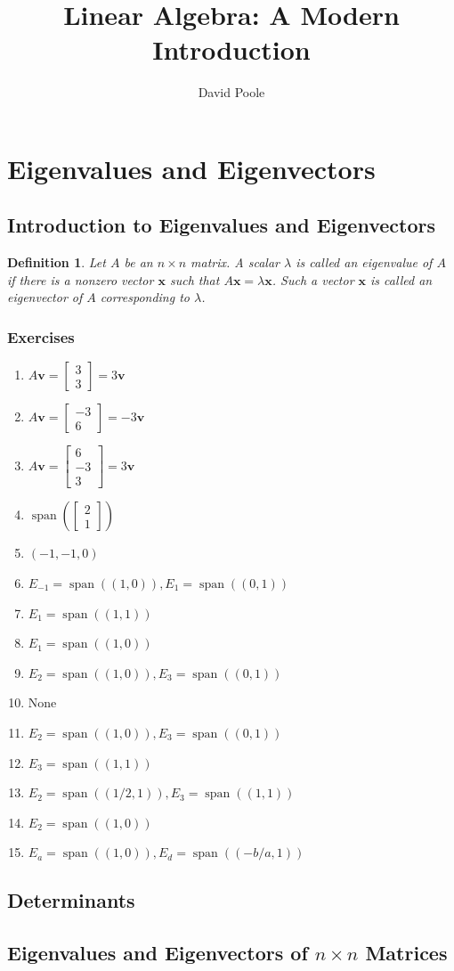 \documentclass{article}
\title{Linear Algebra: A Modern Introduction}
\author{David Poole}
\date{}
\newtheorem*{definition*}{Definition}
\newcommand{\vv}{\mathbf{v}}
\newcommand{\vx}{\mathbf{x}}
\newcommand{\colvecTwo}[2]{\begin{bmatrix}#1\\#2\end{bmatrix}}
\newcommand{\colvecThree}[3]{\begin{bmatrix}#1\\#2\\#3\end{bmatrix}}
\begin{document}
\maketitle
\setcounter{section}{3}
\section{Eigenvalues and Eigenvectors}
\subsection{Introduction to Eigenvalues and Eigenvectors}
\begin{definition*}
	Let $A$ be an $n\times n$ matrix. A scalar $\lambda$ is called an eigenvalue of $A$ if there is a nonzero
	vector $\vx$ such that $A\vx=\lambda\vx$. Such a vector $\vx$ is called an eigenvector of $A$
	corresponding to $\lambda$.
\end{definition*}
\subsubsection*{Exercises}
\begin{enumerate}
	\item $A\vv=\colvecTwo{3}{3}=3\vv$
	      \setcounter{enumi}{2}
	\item $A\vv=\colvecTwo{-3}{6}=-3\vv$
	      \setcounter{enumi}{4}
	\item $A\vv=\colvecThree{6}{-3}{3}=3\vv$
	      \setcounter{enumi}{6}
	\item $\operatorname{span}\left(\colvecTwo{2}{1}\right)$
	      \setcounter{enumi}{10}
	\item $(-1,-1,0)$
	      \setcounter{enumi}{12}
	\item $E_{-1}=\operatorname{span}((1,0)),E_1=\operatorname{span}((0,1))$
	\item $E_1=\operatorname{span}((1,1))$
	\item $E_1=\operatorname{span}((1,0))$
	      \setcounter{enumi}{16}
	\item $E_2=\operatorname{span}((1,0)),E_3=\operatorname{span}((0,1))$
	\item None
	\item $E_2=\operatorname{span}((1,0)),E_3=\operatorname{span}((0,1))$
	      \setcounter{enumi}{20}
	\item $E_3=\operatorname{span}((1,1))$
	      \setcounter{enumi}{22}
	\item $E_2=\operatorname{span}((1/2,1)),E_3=\operatorname{span}((1,1))$
	      \setcounter{enumi}{24}
	\item $E_2=\operatorname{span}((1,0))$
	      \setcounter{enumi}{36}
	\item $E_a=\operatorname{span}((1,0)),E_d=\operatorname{span}((-b/a,1))$
\end{enumerate}

\subsection{Determinants}
\subsection{Eigenvalues and Eigenvectors of $n\times n$ Matrices}
\end{document}
